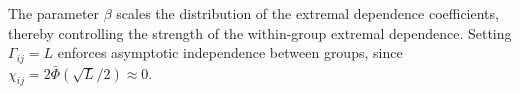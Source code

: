 \documentclass[en-GB, a4paper, nobind]{templates/bathreport}
\newcommand*{\bibtitle}{Bibliography}
\begin{document}
The parameter \(\beta\) scales the distribution of the extremal dependence coefficients, thereby controlling the strength of the within-group extremal dependence. Setting \(\Gamma_{ij}=L\) enforces asymptotic independence between groups, since \(\chi_{ij} = 2\bar{\Phi}(\sqrt{L}/2)\approx 0\).


\setlength{\baselineskip}{0pt} %

{\renewcommand*\MakeUppercase[1]{#1}%
\printbibliography[heading=bibintoc,title={\bibtitle}]}
\end{document}
